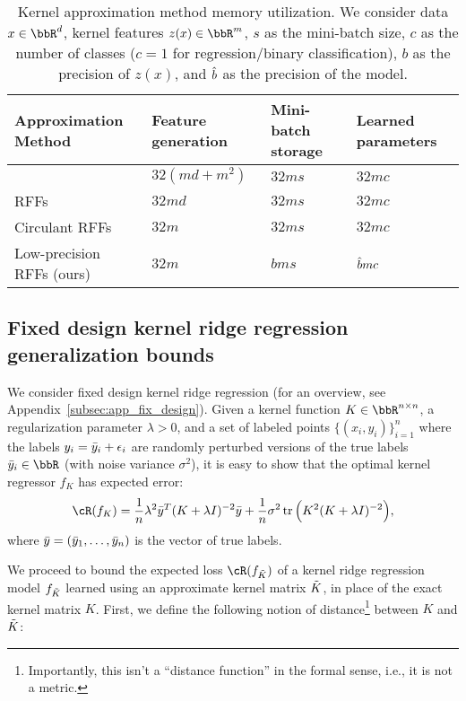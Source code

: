 \begin{table}[h]
	\caption{Kernel approximation method memory utilization. We consider data $x\in\RR^d$, kernel features $z(x)\in\RR^m$, $s$ as the mini-batch size, $c$ as the number of classes ($c=1$ for regression/binary classification), $b$ as the precision of $z(x)$, and $\hat{b}$ as the precision of the model.}
	\label{table:mem-usage}
	\centering
	\begin{tabular}{llll}
		\toprule
		Approximation Method        & Feature generation & Mini-batch storage & Learned parameters \\
		\midrule
		\Nystrom \citep{nystrom}    & $32(md + m^2)$     & $32ms$             & $32mc$ \\
		RFFs \citep{rahimi07random} & $32md$             & $32ms$             & $32mc$ \\
		Circulant RFFs \citep{yu15} & $32m$              & $32ms$             & $32mc$ \\
		Low-precision RFFs (ours)   & $32m$              & $bms$              & $\hat{b} mc$ \\
		\bottomrule
	\end{tabular}
\end{table}
\vsp

\subsection{Fixed design kernel ridge regression generalization bounds}
\label{sec:genbound}
We consider fixed design kernel ridge regression (for an overview, see Appendix~\ref{subsec:app_fix_design}). Given a kernel function $K\in\RR^{n\times n}$, a regularization parameter $\lambda > 0$, and a set of labeled points $\{(x_i,y_i)\}_{i=1}^n$ where the labels $y_i=\bar{y}_i + \epsilon_i$ are randomly perturbed versions of the true labels $\by_i \in \RR$ (with noise variance $\sigma^2$), it is easy to show \citep{alaoui15} that the optimal kernel regressor $f_K$ has expected error:
\begin{eqnarray}
\cR(f_K) = \frac{1}{n}\lambda^2 \by^T(K+\lambda I)^{-2}\by + \frac{1}{n}\sigma^2 \tr\Big(K^2(K+\lambda \id)^{-2}\Big),
\end{eqnarray}
where $\bar{y} = (\bar{y}_1,\ldots,\bar{y}_n)$ is the vector of true labels.

We proceed to bound the expected loss $\cR(f_{\tK})$ of a kernel ridge regression model $f_{\tilde{K}}$ learned using an approximate kernel matrix $\tilde{K}$, in place of the exact kernel matrix $K$. First, we define the following notion of distance\footnote{Importantly, this isn't a ``distance function'' in the formal sense, i.e., it is not a metric.} between $K$ and $\tilde{K}$:

